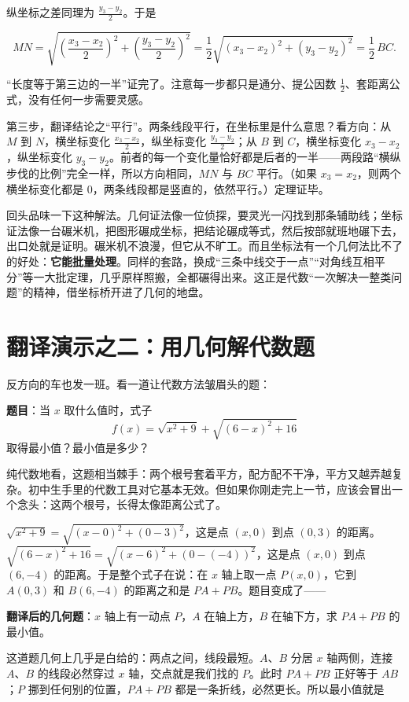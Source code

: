 纵坐标之差同理为 $\frac{y_{3}-y_{2}}{2}$。于是

\[
MN=\sqrt{\left(\frac{x_{3}-x_{2}}{2}\right)^{2}+\left(\frac{y_{3}-y_{2}}{2}\right)^{2}}
=\frac{1}{2}\sqrt{(x_{3}-x_{2})^{2}+(y_{3}-y_{2})^{2}}=\frac{1}{2}\,BC.
\]

“长度等于第三边的一半”证完了。注意每一步都只是通分、提公因数 $\frac{1}{2}$、套距离公式，没有任何一步需要灵感。

第三步，翻译结论之“平行”。两条线段平行，在坐标里是什么意思？看方向：从 $M$ 到 $N$，横坐标变化 $\frac{x_{3}-x_{2}}{2}$，纵坐标变化 $\frac{y_{3}-y_{2}}{2}$；从 $B$ 到 $C$，横坐标变化 $x_{3}-x_{2}$，纵坐标变化 $y_{3}-y_{2}$。前者的每一个变化量恰好都是后者的一半——两段路“横纵步伐的比例”完全一样，所以方向相同，$MN$ 与 $BC$ 平行。（如果 $x_{3}=x_{2}$，则两个横坐标变化都是 $0$，两条线段都是竖直的，依然平行。）定理证毕。

回头品味一下这种解法。几何证法像一位侦探，要灵光一闪找到那条辅助线；坐标证法像一台碾米机，把图形碾成坐标，把结论碾成等式，然后按部就班地碾下去，出口处就是证明。碾米机不浪漫，但它从不旷工。而且坐标法有一个几何法比不了的好处：\textbf{它能批量处理}。同样的套路，换成“三条中线交于一点”“对角线互相平分”等一大批定理，几乎原样照搬，全都碾得出来。这正是代数“一次解决一整类问题”的精神，借坐标桥开进了几何的地盘。

\section{翻译演示之二：用几何解代数题}

反方向的车也发一班。看一道让代数方法皱眉头的题：

\textbf{题目}：当 $x$ 取什么值时，式子
\[
f(x)=\sqrt{x^{2}+9}+\sqrt{(6-x)^{2}+16}
\]
取得最小值？最小值是多少？

纯代数地看，这题相当棘手：两个根号套着平方，配方配不干净，平方又越弄越复杂。初中生手里的代数工具对它基本无效。但如果你刚走完上一节，应该会冒出一个念头：这两个根号，长得太像距离公式了。

$\sqrt{x^{2}+9}=\sqrt{(x-0)^{2}+(0-3)^{2}}$，这是点 $(x,0)$ 到点 $(0,3)$ 的距离。$\sqrt{(6-x)^{2}+16}=\sqrt{(x-6)^{2}+(0-(-4))^{2}}$，这是点 $(x,0)$ 到点 $(6,-4)$ 的距离。于是整个式子在说：在 $x$ 轴上取一点 $P(x,0)$，它到 $A(0,3)$ 和 $B(6,-4)$ 的距离之和是 $PA+PB$。题目变成了——

\textbf{翻译后的几何题}：$x$ 轴上有一动点 $P$，$A$ 在轴上方，$B$ 在轴下方，求 $PA+PB$ 的最小值。

这道题几何上几乎是白给的：两点之间，线段最短。$A$、$B$ 分居 $x$ 轴两侧，连接 $A$、$B$ 的线段必然穿过 $x$ 轴，交点就是我们找的 $P$。此时 $PA+PB$ 正好等于 $AB$；$P$ 挪到任何别的位置，$PA+PB$ 都是一条折线，必然更长。所以最小值就是

